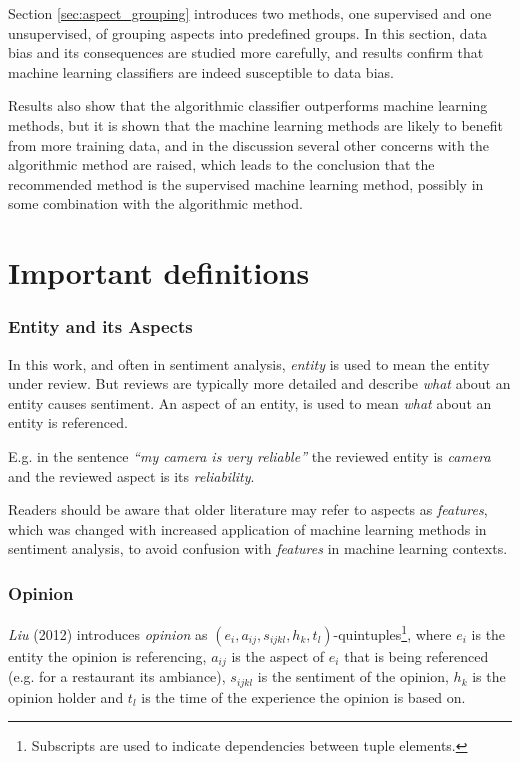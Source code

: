 \documentclass[a4paper,11pt]{kth-mag}
\begin{document}
Section \ref{sec:aspect_grouping} introduces two methods, one supervised and one unsupervised, of grouping aspects into
predefined groups. In this section, data bias and its consequences are studied more carefully, and results confirm that
machine learning classifiers are indeed susceptible to data bias.

Results also show that the algorithmic classifier outperforms machine learning methods, but it is shown that the machine
learning methods are likely to benefit from more training data, and in the discussion several other concerns with the
algorithmic method are raised, which leads to the conclusion that the recommended method is the supervised machine
learning method, possibly in some combination with the algorithmic method.


\pagebreak

\section{Important definitions}

\subsubsection{Entity and its Aspects}
In this work, and often in sentiment analysis, \emph{entity} is used to mean the entity under review. But reviews are typically more detailed
and describe \emph{what} about an entity causes sentiment. An aspect of an entity, is used to mean \emph{what} about an entity is referenced.

E.g. in the sentence \emph{``my camera is very reliable''} the reviewed entity is \emph{camera} and the reviewed aspect is its \emph{reliability}.

Readers should be aware that older literature may refer to aspects as \emph{features}, which was changed with increased application of machine learning methods in sentiment analysis, to avoid confusion with \emph{features} in machine learning contexts.

\subsubsection{Opinion}
\emph{Liu} (2012) introduces \emph{opinion} as $(e_i,a_{ij},s_{ijkl},h_k,t_l)$-quintuples\footnote{Subscripts are
  used to indicate dependencies between tuple elements.},
where $e_i$ is the entity the opinion is referencing,
$a_{ij}$ is the aspect of $e_i$ that is being referenced (e.g. for a restaurant its ambiance),
$s_{ijkl}$ is the sentiment of the opinion,
$h_k$ is the opinion holder and
$t_l$ is the time of the experience the opinion is based on\cite[Chapter~2.1]{liu2012sentiment}.
\end{document}
